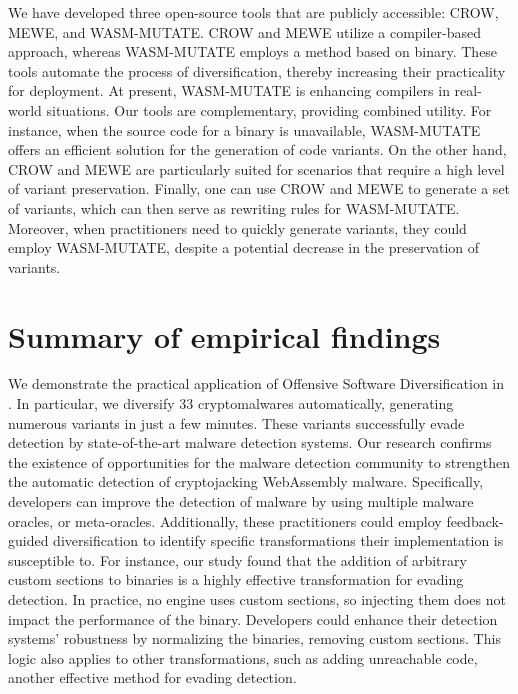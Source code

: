 We have developed three open-source tools that are publicly accessible: CROW, MEWE, and WASM-MUTATE. 
CROW and MEWE utilize a compiler-based approach, whereas WASM-MUTATE employs a method based on binary. 
These tools automate the process of diversification, thereby increasing their practicality for deployment. 
At present, WASM-MUTATE is enhancing \Wasm compilers in real-world situations. 
Our tools are complementary, providing combined utility. 
For instance, when the source code for a \Wasm binary is unavailable, WASM-MUTATE offers an efficient solution for the generation of code variants. 
On the other hand, CROW and MEWE are particularly suited for scenarios that require a high level of variant preservation.
Finally, one can use CROW and MEWE to generate a set of variants, which can then serve as rewriting rules for WASM-MUTATE. 
Moreover, when practitioners need to quickly generate variants, they could employ WASM-MUTATE, despite a potential decrease in the preservation of variants.


 

\section{Summary of empirical findings}

We demonstrate the practical application of Offensive Software Diversification in \Wasm.
In particular, we diversify 33 \Wasm cryptomalwares automatically, generating numerous variants in just a few minutes.
These variants successfully evade detection by state-of-the-art malware detection systems.
Our research confirms the existence of opportunities for the malware detection community to strengthen the automatic detection of cryptojacking WebAssembly malware.
Specifically, developers can improve the detection of \Wasm malware by using multiple malware oracles, or meta-oracles.
Additionally, these practitioners could employ feedback-guided diversification to identify specific transformations their implementation is susceptible to.
For instance, our study found that the addition of arbitrary custom sections to \Wasm binaries is a highly effective transformation for evading detection.
In practice, no \Wasm engine uses custom sections, so injecting them does not impact the performance of the \Wasm binary.
Developers could enhance their detection systems' robustness by normalizing the \Wasm binaries, removing custom sections.
This logic also applies to other transformations, such as adding unreachable code, another effective method for evading detection.


